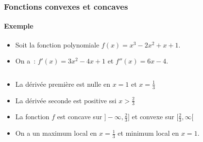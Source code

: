 \documentclass[10pt,notheorems]{beamer}
\theoremstyle{plain}
\theoremstyle{definition} %
\begin{document}
\begin{frame}
  \frametitle{Fonctions convexes et concaves}
  \framesubtitle{Exemple}
  \hypertarget{slide_fonctions_convexes_10}{}

  \begin{itemize}

  \item Soit la fonction polynomiale $f(x) = x^3-2x^2+x+1$.\newline

  \item On a~: $f'(x) = 3x^2-4x+1$ et $f''(x) = 6x-4$.\newline

  \end{itemize}

  \begin{columns}[onlytextwidth]
    \begin{column}{.5\textwidth}
      \begin{itemize}
      \item La dérivée première est nulle en $x=1$ et $x=\frac{1}{3}$\newline
      \item La dérivée seconde est positive ssi $x>\frac{2}{3}$\newline
      \item La fonction $f$ est concave sur $]-\infty,\frac{2}{3}]$ et convexe sur $[\frac{2}{3},\infty[$\newline
      \item On a un maximum local en $x=\frac{1}{3}$ et minimum local en $x=1$.
      \end{itemize}
    \end{column}
    \begin{column}{.5\textwidth}
      \begin{center}
\end{center}
\end{column}
\end{columns}
\end{frame}
\end{document}
